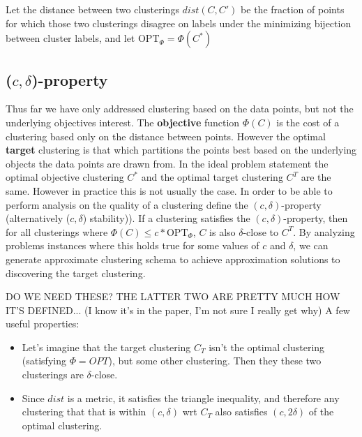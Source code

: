 \documentclass[paper=a4, fontsize=11pt]{scrartcl} %
\numberwithin{equation}{section} %
\numberwithin{figure}{section} %
\numberwithin{table}{section} %
\begin{document}
Let the distance between two clusterings $dist(C, C')$ be the 
fraction of points for which those two clusterings disagree on labels under the minimizing bijection between cluster labels, and let $\text{OPT}_\Phi = \Phi(C^*)$

\subsection{($c, \delta$)-property}
Thus far we have only addressed clustering based on the data points, but not the underlying objectives interest. The \textbf{objective} function $\Phi(C)$ is the cost of a clustering based only on the distance between points. However the optimal \textbf{target} clustering is that which partitions the points best based on the underlying objects the data points are drawn from. In the ideal problem statement the optimal objective clustering $C^*$ and the optimal target clustering $C^T$ are the same. However in practice this is not usually the case. In order to be able to perform analysis on the quality of a clustering \cite{firstpaper} define the $(c, \delta)$-property (alternatively ($c, \delta$) stability)).  If a clustering satisfies the $(c, \delta)$-property, then for all clusterings where $\Phi(C) \leq c*\text{OPT}_\Phi$, $C$ is also $\delta$-close to $C^T$. By analyzing problems instances where this holds true for some values of $c$ and $\delta$, we can generate approximate clustering schema to achieve approximation solutions to discovering the target clustering.

 DO WE NEED THESE? THE LATTER TWO ARE PRETTY MUCH HOW IT'S DEFINED... (I know it's in the paper, I'm not sure I really get why)
 A few useful properties:

\begin{itemize}

\item Let's imagine that the target clustering $C_T$ isn't the optimal clustering (satisfying $\Phi = OPT$), but some other clustering.  Then they these two clusterings are $\delta$-close.

\item Since $dist$ is a metric, it satisfies the triangle inequality, and therefore any clustering that that is within $(c, \delta)$ wrt $C_T$ also satisfies $(c, 2\delta)$ of the optimal clustering. %



\end{itemize}
\end{document}
